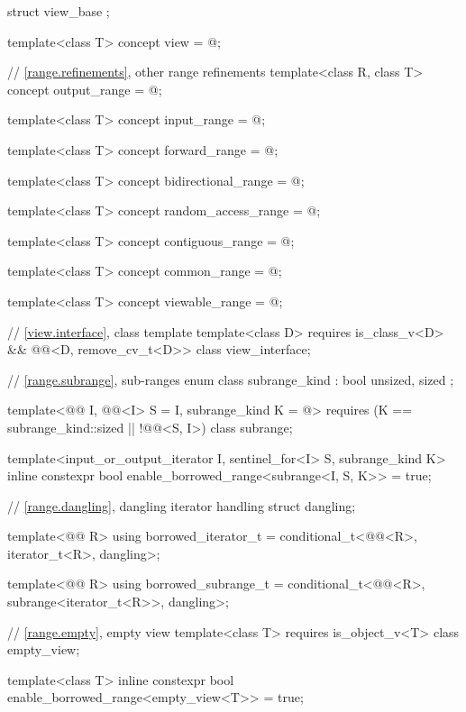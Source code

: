 \begin{codeblock}
{  struct view_base { };

  template<class T>
    concept view = @\seebelow@;

  // \ref{range.refinements}, other range refinements
  template<class R, class T>
    concept output_range = @\seebelow@;

  template<class T>
    concept input_range = @\seebelow@;

  template<class T>
    concept forward_range = @\seebelow@;

  template<class T>
    concept bidirectional_range = @\seebelow@;

  template<class T>
    concept random_access_range = @\seebelow@;

  template<class T>
    concept contiguous_range = @\seebelow@;

  template<class T>
    concept common_range = @\seebelow@;

  template<class T>
    concept viewable_range = @\seebelow@;

  // \ref{view.interface}, class template 
  template<class D>
    requires is_class_v<D> && @@<D, remove_cv_t<D>>
  class view_interface;

  // \ref{range.subrange}, sub-ranges
  enum class subrange_kind : bool { unsized, sized };

  template<@@ I, @@<I> S = I, subrange_kind K = @\seebelow@>
    requires (K == subrange_kind::sized || !@@<S, I>)
  class subrange;

  template<input_or_output_iterator I, sentinel_for<I> S, subrange_kind K>
    inline constexpr bool enable_borrowed_range<subrange<I, S, K>> = true;

  // \ref{range.dangling}, dangling iterator handling
  struct dangling;

  template<@@ R>
    using borrowed_iterator_t = conditional_t<@@<R>, iterator_t<R>, dangling>;

  template<@@ R>
    using borrowed_subrange_t =
      conditional_t<@@<R>, subrange<iterator_t<R>>, dangling>;

  // \ref{range.empty}, empty view
  template<class T>
    requires is_object_v<T>
  class empty_view;

  template<class T>
    inline constexpr bool enable_borrowed_range<empty_view<T>> = true;

}
\end{codeblock}
